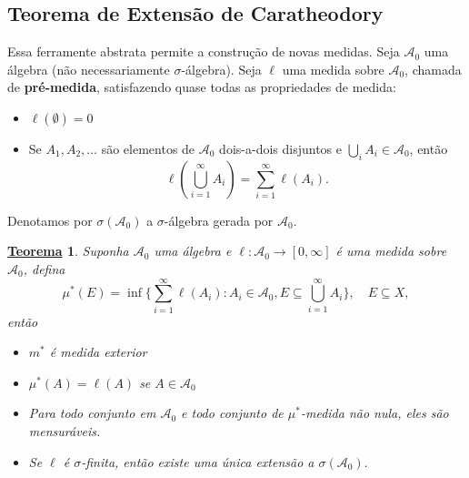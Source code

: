 \documentclass{article}
\newtheorem*{theorem*}{\underline{Teorema}}
\begin{document}
\subsection{Teorema de Extensão de Caratheodory}
  Essa ferramente abstrata permite a construção de novas medidas. Seja \(\mathcal{A}_{0}\) uma álgebra (não necessariamente \(\sigma \)-álgebra). Seja \(\ell \) uma medida sobre \(\mathcal{A}_{0}\), chamada de \textbf{pré-medida}, satisfazendo 
quase todas as propriedades de medida: 
\begin{itemize}
  \item[1)]\(\ell (\emptyset ) = 0\)
    \item[2)] Se \(A_1, A_2, \dotsc \) são elementos de \(\mathcal{A}_{0}\) dois-a-dois disjuntos e \(\bigcup_{i}^{}A_{i}\in \mathcal{A}_{0}\), então 
      \[
        \ell (\bigcup_{i=1}^{\infty}A_{i}) =\sum\limits_{i=1}^{\infty}\ell (A_{i}).
      \]
\end{itemize}
  Denotamos por \(\sigma (\mathcal{A}_{0})\) a \(\sigma \)-álgebra gerada por \(\mathcal{A}_{0}.\)
\begin{theorem*}
  Suponha \(\mathcal{A}_{0}\) uma álgebra e \(\ell :\mathcal{A}_{0}\rightarrow [0, \infty]\) é uma medida sobre \(\mathcal{A}_{0}\), defina 
    \[
      \mu ^{*}(E) = \inf_{}\biggl\{\sum\limits_{i=1}^{\infty}\ell (A_{i}): A_{i}\in \mathcal{A}_{0}, E\subseteq \bigcup_{i=1}^{\infty}A_{i}\biggr\}, \quad E\subseteq X,
    \]
    então 
   \begin{itemize}
    \item[i)] \(m^{*}\) é medida exterior
    \item[ii)] \(\mu ^{*}(A) = \ell (A)\) se \(A\in \mathcal{A}_{0}\)
    \item[iii)] Para todo conjunto em \(\mathcal{A}_{0}\) e todo conjunto de \(\mu^{*}\)-medida não nula, eles são mensuráveis.
    \item[iv)] Se \(\ell \) é \(\sigma \)-finita, então existe uma única extensão a \(\sigma (\mathcal{A}_{0}).\)
   \end{itemize}
\end{theorem*}
\end{document}
